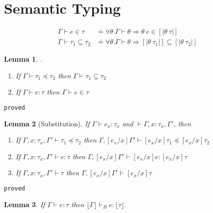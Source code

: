 \documentclass[10pt,a4paper]{article}
\newtheorem{lemma}{Lemma}
\newcommand\showproof[1]{\texttt{proved}}
\newcommand\sub[2]{\ensuremath{\left[ #2 / #1 \right]}}
\newcommand\erase[1]{\ensuremath{\lfloor #1 \rfloor}}
\newcommand\interp[1]{\ensuremath{[|#1|]}}
\newcommand\hastype[3]{\ensuremath{#1 \vdash #2 \colon #3}}
\newcommand\hastypebase[3]{\ensuremath{#1 \vdash_B #2 \colon #3}}
\newcommand\shastype[3]{\ensuremath{#1 \vdash #2 \in #3}}
\newcommand\iswellformed[2]{\ensuremath{#1 \vdash #2}}
\newcommand\issubtype[3]{\ensuremath{#1 \vdash #2 \preceq #3}}
\newcommand\sissubtype[3]{\ensuremath{#1 \vdash #2 \subseteq #3}}
\begin{document}
\section*{Semantic Typing}
\begin{align*}
\shastype{\Gamma}{e}{\tau} & \doteq
	\forall \theta . \iswellformed{\Gamma}{\theta} \Rightarrow \theta\ e \in \interp{\theta \ \tau}\\
\sissubtype{\Gamma}{\tau_1}{\tau_2} & \doteq 
	\forall \theta . \iswellformed{\Gamma}{\theta} \Rightarrow \interp{\theta\ \tau_1} \subseteq \interp{\theta\ \tau_2}
\end{align*}


\begin{lemma}.
\begin{enumerate}
\item If \issubtype{\Gamma}{\tau_1}{\tau_2} then \sissubtype{\Gamma}{\tau_1}{\tau_2} 
\item If \hastype{\Gamma}{e}{\tau} then \shastype{\Gamma}{e}{\tau} 
\end{enumerate}
\end{lemma}
\showproof{
	\begin{proof}
	
	\end{proof}
}


\begin{lemma}[Substitution]\label{lemma:substitution}
If \hastype{\Gamma}{e_x}{\tau_x} and \iswellformed{}{\Gamma, x\colon\tau_x ,\Gamma'}, then 
\begin{enumerate}
\item If 
	\issubtype{\Gamma, x\colon\tau_x, \Gamma'}{\tau_1}{\tau_2}
	then
	\issubtype{\Gamma, \sub{x}{e_x}\Gamma'}{\sub{x}{e_x}\tau_1}{\sub{x}{e_x}\tau_2}
\item If 
	\hastype{\Gamma, x\colon\tau_x, \Gamma'}{e}{\tau}
	then
	\hastype{\Gamma, \sub{x}{e_x}\Gamma'}{\sub{x}{e_x}e}{\sub{x}{e_x}\tau}
\item If 
	\iswellformed{\Gamma, x\colon\tau_x, \Gamma'}{\tau}
	then
	\iswellformed{\Gamma, \sub{x}{e_x}\Gamma'}{\sub{x}{e_x}\tau}
\end{enumerate}
\end{lemma}
\showproof{
	\begin{proof}
	
	\end{proof}
}

\begin{lemma}\label{lemma:erase} %
If \hastype{\Gamma}{e}{\tau} 
then \hastypebase{\erase{\Gamma}}{e}{\erase{\tau}}.
\end{lemma}
\end{document}
